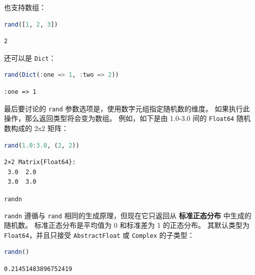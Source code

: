 \documentclass[
  notoc %
]{tufte-book}
\makeatletter
\newcommand{\passthrough}[1]{#1}
\renewcommand\subsubsection{%
\@startsection{subsubsection}{3}{\z@ }{-3.25ex\@plus -1ex \@minus -.2ex}{1.5ex \@plus .2ex}{\normalfont \normalsize \bfseries }
}
\makeatother
\begin{document}
也支持数组：

\begin{lstlisting}[language=Julia]
rand([1, 2, 3])
\end{lstlisting}

\begin{lstlisting}[language=Output]
2
\end{lstlisting}

还可以是 \passthrough{\lstinline!Dict!}：

\begin{lstlisting}[language=Julia]
rand(Dict(:one => 1, :two => 2))
\end{lstlisting}

\begin{lstlisting}[language=Output]
:one => 1
\end{lstlisting}

最后要讨论的 \passthrough{\lstinline!rand!}
参数选项是，使用数字元组指定随机数的维度。
如果执行此操作，那么返回类型将会变为数组。 例如，如下是由 1.0-3.0 间的
\passthrough{\lstinline!Float64!} 随机数构成的 2x2 矩阵：

\begin{lstlisting}[language=Julia]
rand(1.0:3.0, (2, 2))
\end{lstlisting}

\begin{lstlisting}[language=Output]
2×2 Matrix{Float64}:
 3.0  2.0
 3.0  3.0
\end{lstlisting}

\hypertarget{sec:random_randn}{%
\subsubsection{\texorpdfstring{\texttt{randn}}{randn}}\label{sec:random_randn}}

\passthrough{\lstinline!randn!} 遵循与 \passthrough{\lstinline!rand!}
相同的生成原理，但现在它只返回从 \textbf{标准正态分布} 中生成的随机数。
标准正态分布是平均值为 0 和标准差为 1 的正态分布。 其默认类型为
\passthrough{\lstinline!Float64!}，并且只接受
\passthrough{\lstinline!AbstractFloat!} 或
\passthrough{\lstinline!Complex!} 的子类型：

\begin{lstlisting}[language=Julia]
randn()
\end{lstlisting}

\begin{lstlisting}[language=Output]
0.21451483896752419
\end{lstlisting}
\end{document}
